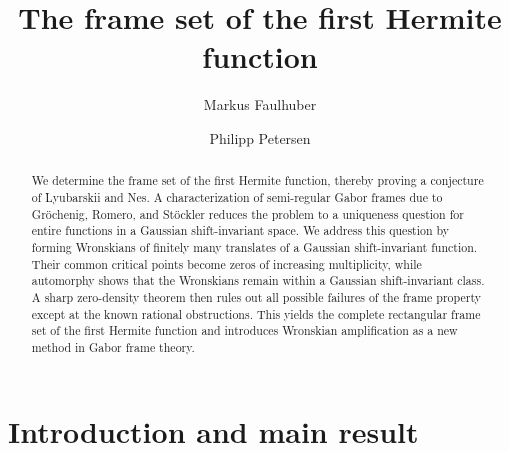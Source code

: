 \documentclass[11pt]{amsart}
\title{The frame set of the first Hermite function}
\author[M. Faulhuber]{Markus Faulhuber}
\author[P. Petersen]{Philipp Petersen}
\date{}
\numberwithin{equation}{section}
\theoremstyle{definition}
\theoremstyle{remark}
\begin{document}
\begin{abstract}
    We determine the frame set of the first Hermite function, thereby proving a conjecture of Lyubarskii and Nes. A characterization of semi-regular Gabor frames due to Gr\"ochenig, Romero, and St\"ockler reduces the problem to a uniqueness question for entire functions in a Gaussian shift-invariant space. We address this question by forming Wronskians of finitely many translates of a Gaussian shift-invariant function. Their common critical points become zeros of increasing multiplicity, while automorphy shows that the Wronskians remain within a Gaussian shift-invariant class. A sharp zero-density theorem then rules out all possible failures of the frame property except at the known rational obstructions. This yields the complete rectangular frame set of the first Hermite function and introduces Wronskian amplification as a new method in Gabor frame theory.
\end{abstract}

\maketitle

\vspace{-\baselineskip}
\section{\texorpdfstring{Introduction and main result}{Introduction and main result}}\label{sec:intro}
\end{document}
